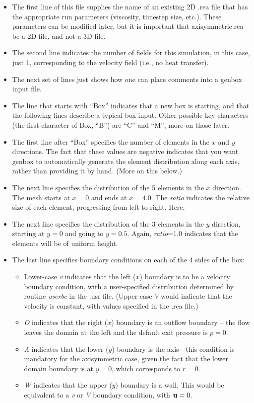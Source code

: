 \begin{itemize}
\item
The first line of this file supplies the name of an existing 2D .rea file
that has the appropriate run parameters (viscosity, timestep size, etc.).
These parameters can be modified later, but it is important that 
axisymmetric.rea be a 2D file, and not a 3D file.
\item
The second line indicates the number of fields for this simulation, in
this case, just 1, corresponding to the velocity field (i.e., no heat 
transfer).
\item
The next set of lines just shows how one can place comments into a genbox
input file.
\item
The line that starts with ``Box'' indicates that a new box is starting,
and that the following lines describe a typical box input.  Other possible
key characters (the first character of Box, ``B'') are ``C'' and ``M'',
more on those later.
\item
The first line after ``Box'' specifies the number of elements in the
$x$ and $y$ directions.   The fact that these values are negative indicates
that you want genbox to automatically generate the element distribution 
along each axis, rather than providing it by hand.  (More on this below.)
\item
The next line specifies the distribution of the 5 elements in the $x$ direction.
The mesh starts at $x=0$ and ends at $x=4.0$.  The {\em ratio} indicates the
relative size of each element, progressing from left to right.  Here, 
\item
The next line specifies the distribution of the 3 elements in the $y$ direction,
starting at $y=0$ and going to $y=0.5$.  Again, 
{\em ratio}=1.0 indicates that the elements will be of uniform height.
\item
The last line specifies boundary conditions on each of the 4 sides of the
box:  
\begin{itemize}
\item
Lower-case {\em v} indicates that the left ($x$) boundary is to be a velocity
boundary condition, with a user-specified distribution determined by 
routine {\em userbc} in the .usr file.  (Upper-case $V$ would indicate that
the velocity is constant, with values specified in the .rea file.)
\item
{\em O} indicates that the right ($x$) boundary is an outflow boundary -- the
flow leaves the domain at the left and the default exit pressure is $p=0$.
\item
{\em A} indicates that the lower ($y$) boundary is the axis---this condition
is mandatory for the axisymmetric case, given the fact that the lower domain
boundary is at $y=0$, which corresponds to $r=0$.
\item
{\em W} indicates that the upper ($y$) boundary is a wall.  This would be
equivalent to a {\em v} or {\em V} boundary condition, with ${\bf u}=0$.
\end{itemize}
\end{itemize}



